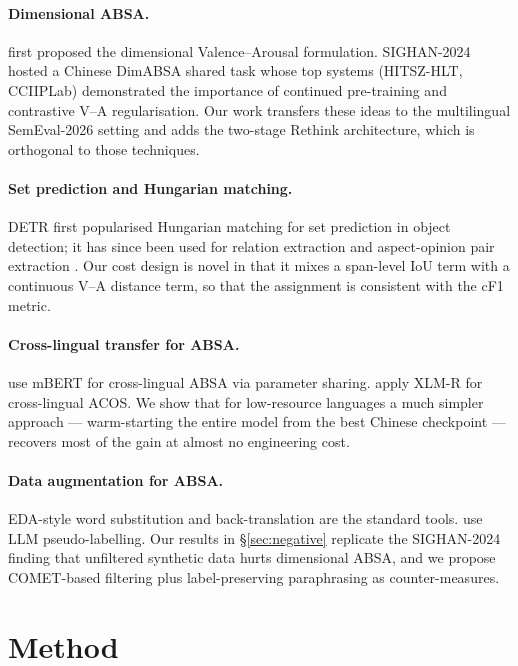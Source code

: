 \documentclass[11pt]{article}
\begin{document}
\paragraph{Dimensional ABSA.}
\citet{lee2022dimabsa} first proposed the dimensional Valence--Arousal
formulation. SIGHAN-2024 \cite{sighan2024dimabsa} hosted a Chinese
DimABSA shared task whose top systems
(HITSZ-HLT, CCIIPLab) demonstrated the importance of continued
pre-training and contrastive V--A regularisation. Our work transfers
these ideas to the multilingual SemEval-2026 setting and adds the
two-stage Rethink architecture, which is orthogonal to those
techniques.

\paragraph{Set prediction and Hungarian matching.}
DETR \cite{carion2020detr} first popularised Hungarian matching for
set prediction in object detection; it has since been used for
relation extraction \cite{tan2022rete} and aspect-opinion pair
extraction \cite{chen2022spaopn}. Our cost design is novel in that it
mixes a span-level IoU term with a continuous V--A distance term, so
that the assignment is consistent with the cF1 metric.

\paragraph{Cross-lingual transfer for ABSA.}
\citet{li2020xabsa} use mBERT for cross-lingual ABSA via parameter
sharing.
\citet{lin2023xacos} apply XLM-R for cross-lingual ACOS.
We show that for low-resource languages a much simpler approach —
warm-starting the entire model from the best Chinese checkpoint —
recovers most of the gain at almost no engineering cost.

\paragraph{Data augmentation for ABSA.}
EDA-style word substitution \cite{wei2019eda} and back-translation
\cite{sennrich2016bt} are the standard tools.
\citet{li2024llmabsa} use LLM pseudo-labelling. Our results in
\S\ref{sec:negative} replicate the SIGHAN-2024 finding that
unfiltered synthetic data hurts dimensional ABSA, and we propose
COMET-based filtering plus label-preserving paraphrasing as
counter-measures.

\section{Method}
\label{sec:method}
\end{document}
